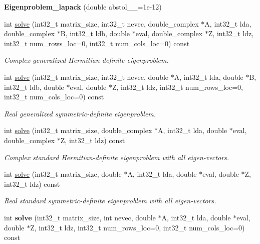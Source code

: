 \begin{DoxyCompactItemize}
\item 
\hypertarget{class_eigenproblem__lapack_a9ac12153e9c94e214eb33e3ceaa9bca0}{}{\bfseries Eigenproblem\+\_\+lapack} (double abstol\+\_\+\+\_\+=1e-\/12)\label{class_eigenproblem__lapack_a9ac12153e9c94e214eb33e3ceaa9bca0}

\item 
int \hyperlink{class_eigenproblem__lapack_a3d78d413631533b83be968c6fe73d5cb}{solve} (int32\+\_\+t matrix\+\_\+size, int32\+\_\+t nevec, double\+\_\+complex $\ast$A, int32\+\_\+t lda, double\+\_\+complex $\ast$B, int32\+\_\+t ldb, double $\ast$eval, double\+\_\+complex $\ast$Z, int32\+\_\+t ldz, int32\+\_\+t num\+\_\+rows\+\_\+loc=0, int32\+\_\+t num\+\_\+cols\+\_\+loc=0) const 
\begin{DoxyCompactList}\small\item\em Complex generalized Hermitian-\/definite eigenproblem. \end{DoxyCompactList}\item 
int \hyperlink{class_eigenproblem__lapack_a04f8ac91b8384b32c448ae8c3b408396}{solve} (int32\+\_\+t matrix\+\_\+size, int32\+\_\+t nevec, double $\ast$A, int32\+\_\+t lda, double $\ast$B, int32\+\_\+t ldb, double $\ast$eval, double $\ast$Z, int32\+\_\+t ldz, int32\+\_\+t num\+\_\+rows\+\_\+loc=0, int32\+\_\+t num\+\_\+cols\+\_\+loc=0) const 
\begin{DoxyCompactList}\small\item\em Real generalized symmetric-\/definite eigenproblem. \end{DoxyCompactList}\item 
int \hyperlink{class_eigenproblem__lapack_abf2ce7dfeab93668b49c4d6190c307cd}{solve} (int32\+\_\+t matrix\+\_\+size, double\+\_\+complex $\ast$A, int32\+\_\+t lda, double $\ast$eval, double\+\_\+complex $\ast$Z, int32\+\_\+t ldz) const 
\begin{DoxyCompactList}\small\item\em Complex standard Hermitian-\/definite eigenproblem with all eigen-\/vectors. \end{DoxyCompactList}\item 
int \hyperlink{class_eigenproblem__lapack_a06c177a75b8195d1c7a03d56ee6d343e}{solve} (int32\+\_\+t matrix\+\_\+size, double $\ast$A, int32\+\_\+t lda, double $\ast$eval, double $\ast$Z, int32\+\_\+t ldz) const 
\begin{DoxyCompactList}\small\item\em Real standard symmetric-\/definite eigenproblem with all eigen-\/vectors. \end{DoxyCompactList}\item 
\hypertarget{class_eigenproblem__lapack_a08fe4dcef6d8d2f31da5e59590e86d5a}{}int {\bfseries solve} (int32\+\_\+t matrix\+\_\+size, int nevec, double $\ast$A, int32\+\_\+t lda, double $\ast$eval, double $\ast$Z, int32\+\_\+t ldz, int32\+\_\+t num\+\_\+rows\+\_\+loc=0, int32\+\_\+t num\+\_\+cols\+\_\+loc=0) const \label{class_eigenproblem__lapack_a08fe4dcef6d8d2f31da5e59590e86d5a}


\end{DoxyCompactItemize}
